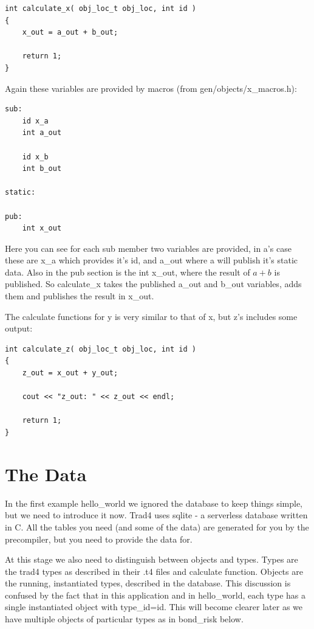 \documentclass{report}
\begin{document}
\begin{verbatim}
int calculate_x( obj_loc_t obj_loc, int id )
{
    x_out = a_out + b_out;

    return 1;
}
\end{verbatim}

Again these variables are provided by macros (from gen/objects/x_macros.h):


\begin{verbatim}
sub:
    id x_a
    int a_out

    id x_b
    int b_out

static:

pub:
    int x_out
\end{verbatim}

Here you can see for each sub member two variables are provided, in a's case these are x_a which provides it's id, and a_out where a will publish it's static data. Also in the pub section is the int x_out, where the result of  \(a + b\) is published. So calculate_x takes the published a_out and b_out variables, adds them and publishes the result in x_out.

The calculate functions for y is very similar to that of x, but z's includes some output:

\begin{verbatim}
int calculate_z( obj_loc_t obj_loc, int id )
{
    z_out = x_out + y_out;

    cout << "z_out: " << z_out << endl;

    return 1;
}
\end{verbatim}

\section{The Data}
\label{sec:The Data}

In the first example hello_world we ignored the database to keep things simple, but we need to introduce it now. Trad4 uses sqlite - a serverless database written in C. All the tables you need (and some of the data) are generated for you by the precompiler, but you need to provide the data for. 

At this stage we also need to distinguish between objects and types. Types are the trad4 types as described in their .t4 files and calculate function. Objects are the running, instantiated types, described in the database. This discussion is confused by the fact that in this application and in hello_world, each type has a single instantiated object with type_id=id. This will become clearer later as we have multiple objects of particular types as in bond_risk below.
\end{document}
